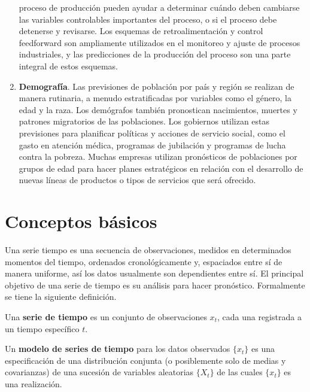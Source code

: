 \documentclass[12pt,]{krantz}
\theoremstyle{definition}
\theoremstyle{definition}
\theoremstyle{definition}
\theoremstyle{remark}
\let\BeginKnitrBlock\begin \let\EndKnitrBlock\end
\begin{document}
\begin{enumerate}
  proceso de producción pueden ayudar a determinar cuándo deben
  cambiarse las variables controlables importantes del proceso, o si el
  proceso debe detenerse y revisarse. Los esquemas de retroalimentación
  y control feedforward son ampliamente utilizados en el monitoreo y
  ajuste de procesos industriales, y las predicciones de la producción
  del proceso son una parte integral de estos esquemas.
\item
  \textbf{Demografía}. Las previsiones de población por país y región se
  realizan de manera rutinaria, a menudo estratificadas por variables
  como el género, la edad y la raza. Los demógrafos también pronostican
  nacimientos, muertes y patrones migratorios de las poblaciones. Los
  gobiernos utilizan estas previsiones para planificar políticas y
  acciones de servicio social, como el gasto en atención médica,
  programas de jubilación y programas de lucha contra la pobreza. Muchas
  empresas utilizan pronósticos de poblaciones por grupos de edad para
  hacer planes estratégicos en relación con el desarrollo de nuevas
  líneas de productos o tipos de servicios que será ofrecido.
\end{enumerate}

\section{Conceptos básicos}\label{conceptos-basicos}

Una serie tiempo es una secuencia de observaciones, medidos en
determinados momentos del tiempo, ordenados cronológicamente y,
espaciados entre sí de manera uniforme, así los datos usualmente son
dependientes entre sí. El principal objetivo de una serie de tiempo es
su análisis para hacer pronóstico. Formalmente se tiene la siguiente
definición.

\BeginKnitrBlock{definition}
\protect\hypertarget{def:defi-serie-tiempo}{}{\label{def:defi-serie-tiempo}
}Una \textbf{serie de tiempo} es un conjunto de observaciones \(x_t\),
cada una registrada a un tiempo específico \(t\).
\EndKnitrBlock{definition}

\BeginKnitrBlock{definition}
\protect\hypertarget{def:defi-modelo-serie-tiempo}{}{\label{def:defi-modelo-serie-tiempo}
}Un \textbf{modelo de series de tiempo} para los datos observados
\(\{x_t\}\) es una especificación de una distribución conjunta (o
posiblemente solo de medias y covarianzas) de una sucesión de variables
aleatorias \(\{X_t\}\) de las cuales \(\{x_t\}\) es una realización.
\EndKnitrBlock{definition}
\end{document}
